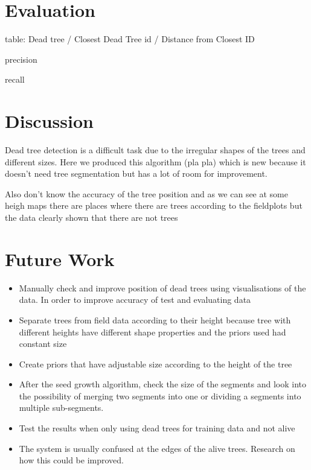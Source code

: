 \documentclass{subfiles}
\begin{document}
\newpage
\section{Evaluation} 

\par table: Dead tree / Closest Dead Tree id / Distance from Closest ID

\par precision

\par recall
		
		
\section{Discussion}

\par Dead tree detection is a difficult task due to the irregular shapes of the trees and different sizes. Here we produced this algorithm (pla pla) which is new because it doesn't need tree segmentation but has a lot of room for improvement. 

Also don't know the accuracy of the tree position and as we can see at some heigh maps there are places where there are trees according to the fieldplots but the data clearly shown that there are not trees
\section{Future Work}

\begin{itemize}
	\item Manually check and improve position of dead trees using visualisations of the data. In order to improve accuracy of test and evaluating data
	\item Separate trees from field data according to their height because tree with different heights have different shape properties and the priors used had constant size
	\item Create priors that have adjustable size according to the height of the tree	
	\item After the seed growth algorithm, check the size of the segments and look into the possibility of merging two segments into one or dividing a segments into multiple sub-segments.
	\item Test the results when only using dead trees for training data and not alive
	\item The system is usually confused at the edges of the alive trees. Research on how this could be improved. 
\end{itemize}
\end{document}
